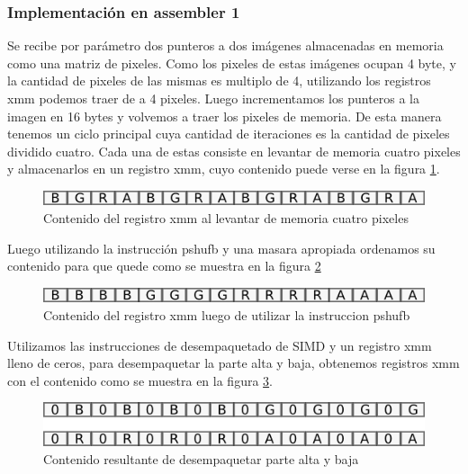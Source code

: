 \documentclass[a4paper]{article}
\begin{document}
\subsubsection{Implementación en assembler 1}

Se recibe por parámetro dos punteros a dos imágenes almacenadas en memoria como una matriz de pixeles. Como los pixeles de estas imágenes ocupan 4 byte, y la cantidad de pixeles de las mismas es multiplo de 4,  utilizando los registros xmm podemos traer de a 4 pixeles. Luego incrementamos los punteros a la imagen en 16 bytes y volvemos a traer los pixeles de memoria. De esta manera tenemos un ciclo principal cuya cantidad de iteraciones es la cantidad de pixeles dividido cuatro. Cada una de estas consiste en levantar de memoria cuatro pixeles y almacenarlos en un registro xmm, cuyo contenido puede verse en la figura \ref{primerXmm}.

\begin{figure}[H]
\centering
\includegraphics[scale=0.8]{imagenes/primerXmm.png}
\caption{Contenido del registro xmm al levantar de memoria cuatro pixeles}
\label{primerXmm}
\end{figure}

Luego utilizando la instrucción pshufb y una masara apropiada ordenamos su contenido para que quede como se muestra en la figura \ref{segundoXmm}

\begin{figure}[H]
\centering
\includegraphics[scale=0.8]{imagenes/segundoXmm.png}
\caption{Contenido del registro xmm luego de utilizar la instruccion pshufb}
\label{segundoXmm}
\end{figure}

Utilizamos las instrucciones de desempaquetado de SIMD y un registro xmm lleno de ceros, para desempaquetar la parte alta y baja, obtenemos registros xmm con el contenido como se muestra en la figura \ref{tercerXmm}.


\begin{figure}[H]
\centering
\includegraphics[scale=0.8]{imagenes/tecerXmm.png}
\caption{Contenido resultante de desempaquetar parte alta y baja}
\label{tercerXmm}
\end{figure}
\end{document}
